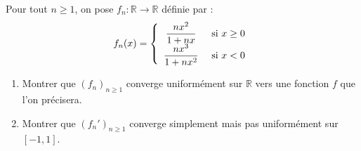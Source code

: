 \documentclass[a4paper,10pt]{report}
\begin{document}
\begin{Exa} Pour tout $n \geq 1$, on pose $f_n : \mathbb{R} \rightarrow \mathbb{R}$ définie par :
$$ f_n(x)= \left\lbrace \begin{array}{cl}
\dfrac{nx^2}{1+nx} & \hbox{ si } x \geq 0 \\
\dfrac{nx^3}{1+nx^2} & \hbox{ si } x < 0 \\
\end{array}\right.$$
\begin{enumerate}
\item Montrer que $(f_n)_{n \geq 1}$ converge uniformément sur $\mathbb{R}$ vers une fonction $f$ que l'on précisera.
\item Montrer que $(f_n')_{n \geq 1}$ converge simplement mais pas uniformément sur $[-1,1]$.
\end{enumerate}
\end{Exa}
\end{document}
